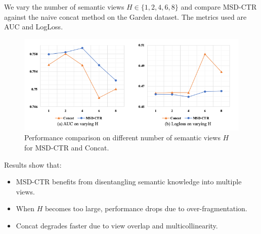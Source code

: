 We vary the number of semantic views $H \in \{1, 2, 4, 6, 8\}$ and compare MSD-CTR against the naive concat method on the Garden dataset. The metrics used are AUC and LogLoss.

\begin{figure}[htbp]
    \centering
    \includegraphics[width=\textwidth]{Figures/Chapter5/fig4.png}
    \caption{Performance comparison on different number of semantic views $H$ for MSD-CTR and Concat.}
    \label{fig:view-ablation}
\end{figure}

Results show that:
\begin{itemize}
    \item MSD-CTR benefits from disentangling semantic knowledge into multiple views.
    \item When $H$ becomes too large, performance drops due to over-fragmentation.
    \item Concat degrades faster due to view overlap and multicollinearity.
\end{itemize}
